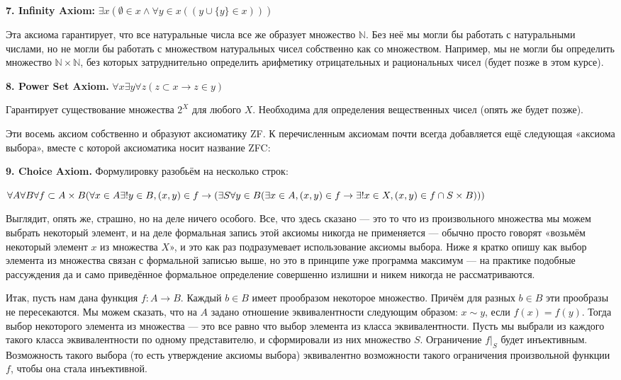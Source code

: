 {\bfseries 7. Infinity Axiom:} $\exists x (\emptyset \in x \wedge \forall y \in x ((y\cup\{y\}\in x)))$

Эта аксиома гарантирует, что все натуральные числа все же образует множество $\mathbb{N}$. Без неё мы могли бы работать с натуральными числами, но не могли бы работать с множеством натуральных чисел собственно как со множеством. Например, мы не могли бы определить множество $\mathbb{N}\times\mathbb{N}$, без которых затруднительно определить арифметику отрицательных и рациональных чисел (будет позже в этом курсе).

{\bfseries 8. Power Set Axiom.} $\forall x \exists y \forall z (z\subset x \rightarrow z\in y)$

Гарантирует существование множества $2^X$ для любого $X$. Необходима для определения вещественных чисел (опять же будет позже).

Эти восемь аксиом собственно и образуют аксиоматику ZF. К перечисленным аксиомам почти всегда добавляется ещё следующая «аксиома выбора», вместе с которой аксиоматика носит название ZFC:

{\bfseries 9. Choice Axiom.} Формулировку разобьём на несколько строк:

$\forall A \forall B \forall f\subset A\times B \\(\forall x \in A \exists! y\in B, (x, y)\in f\rightarrow\\ (\exists S\forall y\in B(\exists x\in A, (x, y)\in f \rightarrow \\ \exists!x\in X, (x, y)\in f\cap S\times B)))$

Выглядит, опять же, страшно, но на деле ничего особого. Все, что здесь сказано — это то что из произвольного множества мы можем выбрать некоторый элемент, и на деле формальная запись этой аксиомы никогда не применяется — обычно просто говорят «возьмём некоторый элемент $x$ из множества $X$», и это как раз подразумевает использование аксиомы выбора. Ниже я кратко опишу как выбор элемента из множества связан с формальной записью выше, но это в принципе уже программа максимум — на практике подобные рассуждения да и само приведённое формальное определение совершенно излишни и никем никогда не рассматриваются.

Итак, пусть нам дана функция $f: A\to B$. Каждый $b \in B$ имеет прообразом некоторое множество. Причём для разных $b\in B$ эти прообразы не пересекаются. Мы можем сказать, что на $A$ задано отношение эквивалентности следующим образом: $x\sim y$, если $f(x) = f(y)$. Тогда выбор некоторого элемента из множества — это все равно что выбор элемента из класса эквивалентности. Пусть мы выбрали из каждого такого класса эквивалентности по одному представителю, и сформировали из них множество $S$. Ограничение $f|_S$ будет инъективным. Возможность такого выбора (то есть утверждение аксиомы выбора) эквивалентно возможности такого ограничения произвольной функции $f$, чтобы она стала инъективной.

